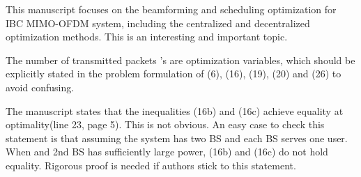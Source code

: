 This manuscript focuses on the beamforming and scheduling optimization for IBC MIMO-OFDM system, including the centralized and decentralized optimization methods. This is an interesting and important topic.

\vspace{0.1in}

\begin{enumerate}
 The number of transmitted packets 's are optimization variables, which should be explicitly stated in the problem formulation of (6), (16), (19), (20) and (26) to avoid confusing.

\resp {}

 The manuscript states that the inequalities (16b) and (16c) achieve equality at optimality(line 23, page 5). This is not obvious. An easy case to check this statement is that assuming the system has two BS and each BS serves one user. When  and 2nd BS has sufficiently large power, (16b) and (16c) do not hold equality. Rigorous proof is needed if authors stick to this statement.


\end{enumerate}

